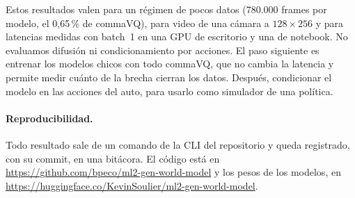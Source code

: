 \documentclass[10pt,twocolumn,a4paper]{article}
\DeclareRobustCommand{\editado}[1]{\textcolor{editado}{#1}}
\DeclareRobustCommand{\editado}[1]{#1}
\begin{document}
\editado{Estos resultados valen para un régimen de pocos datos (780.000 frames por modelo, el 0,65\,\% de commaVQ), para video de una cámara a $128\times256$ y para latencias medidas con batch~1 en una GPU de escritorio y una de notebook. No evaluamos difusión ni condicionamiento por acciones. El paso siguiente es entrenar los modelos chicos con todo commaVQ, que no cambia la latencia y permite medir cuánto de la brecha cierran los datos. Después, condicionar el modelo en las acciones del auto, para usarlo como simulador de una política.}

\paragraph{Reproducibilidad.} Todo resultado sale de un comando de la CLI del repositorio y queda registrado, con su commit, en una bitácora. \editado{El código está en \url{https://github.com/bpeco/ml2-gen-world-model} y los pesos de los modelos, en \url{https://huggingface.co/KevinSoulier/ml2-gen-world-model}.}



\end{document}
